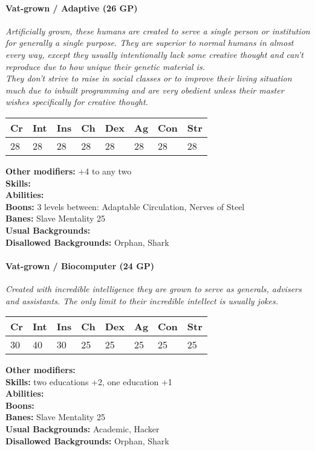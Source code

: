 \hrulefill
\paragraph*{Vat-grown / Adaptive (26 GP)}
\textit{Artificially grown, these humans are created to serve a single person or institution for generally a single purpose. They are superior to normal humans in almost every way, except they usually intentionally lack some creative thought and can't reproduce due to how unique their genetic material is.\\
	They don't strive to raise in social classes or to improve their living situation much due to inbuilt programming and are very obedient unless their master wishes specifically for creative thought.}\par
\begin{tabular}{|l|l|l|l|l|l|l|l|}
	\hline
	Cr & Int & Ins & Ch & Dex & Ag & Con & Str \\ \hline
	28 & 28 & 28 & 28 & 28 & 28 & 28 & 28 \\ \hline
\end{tabular}\par
\noindent\textbf{Other modifiers:} +4 to any two\\
\textbf{Skills:} \\
\textbf{Abilities:} \\
\textbf{Boons:} 3 levels between: Adaptable Circulation, Nerves of Steel\\
\textbf{Banes:} Slave Mentality 25\\
\textbf{Usual Backgrounds:} \\
\textbf{Disallowed Backgrounds:} Orphan, Shark

\hrulefill
\paragraph*{Vat-grown / Biocomputer (24 GP)}
\textit{Created with incredible intelligence they are grown to serve as generals, advisers and assistants. The only limit to their incredible intellect is usually jokes.}\par
\begin{tabular}{|l|l|l|l|l|l|l|l|}
	\hline
	Cr & Int & Ins & Ch & Dex & Ag & Con & Str \\ \hline
	30 & 40 & 30 & 25 & 25 & 25 & 25 & 25 \\ \hline
\end{tabular}\par
\noindent\textbf{Other modifiers:} \\
\textbf{Skills:} two educations +2,
one education +1\\
\textbf{Abilities:} \\
\textbf{Boons:} \\
\textbf{Banes:} Slave Mentality 25\\
\textbf{Usual Backgrounds:} Academic, Hacker\\
\textbf{Disallowed Backgrounds:} Orphan, Shark

